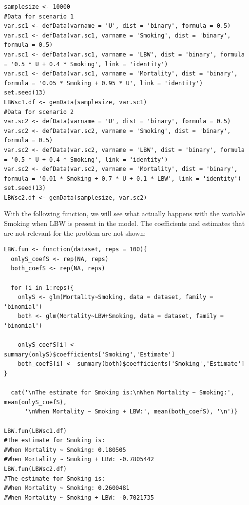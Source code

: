\documentclass{article}
\begin{document}
\begin{lstlisting}
samplesize <- 10000
#Data for scenario 1
var.sc1 <- defData(varname = 'U', dist = 'binary', formula = 0.5)
var.sc1 <- defData(var.sc1, varname = 'Smoking', dist = 'binary', formula = 0.5)
var.sc1 <- defData(var.sc1, varname = 'LBW', dist = 'binary', formula = '0.5 * U + 0.4 * Smoking', link = 'identity')
var.sc1 <- defData(var.sc1, varname = 'Mortality', dist = 'binary', formula = '0.05 * Smoking + 0.95 * U', link = 'identity')
set.seed(13)
LBWsc1.df <- genData(samplesize, var.sc1)
#Data for scenario 2
var.sc2 <- defData(varname = 'U', dist = 'binary', formula = 0.5)
var.sc2 <- defData(var.sc2, varname = 'Smoking', dist = 'binary', formula = 0.5)
var.sc2 <- defData(var.sc2, varname = 'LBW', dist = 'binary', formula = '0.5 * U + 0.4 * Smoking', link = 'identity')
var.sc2 <- defData(var.sc2, varname = 'Mortality', dist = 'binary', formula = '0.01 * Smoking + 0.7 * U + 0.1 * LBW', link = 'identity')
set.seed(13)
LBWsc2.df <- genData(samplesize, var.sc2)
\end{lstlisting}

With the following function, we will see what actually happens with the variable Smoking when LBW is present in the model. The coefficients and estimates that are not relevant for the problem are not shown:\par

\begin{lstlisting}
LBW.fun <- function(dataset, reps = 100){
  onlyS_coefS <- rep(NA, reps)
  both_coefS <- rep(NA, reps)
  
  for (i in 1:reps){
    onlyS <- glm(Mortality~Smoking, data = dataset, family = 'binomial')
    both <- glm(Mortality~LBW+Smoking, data = dataset, family = 'binomial')
    
    onlyS_coefS[i] <- summary(onlyS)$coefficients['Smoking','Estimate']
    both_coefS[i] <- summary(both)$coefficients['Smoking','Estimate'] }
  
  cat('\nThe estimate for Smoking is:\nWhen Mortality ~ Smoking:', mean(onlyS_coefS),
      '\nWhen Mortality ~ Smoking + LBW:', mean(both_coefS), '\n')}
      
LBW.fun(LBWsc1.df)
#The estimate for Smoking is:
#When Mortality ~ Smoking: 0.180505 
#When Mortality ~ Smoking + LBW: -0.7805442
LBW.fun(LBWsc2.df)
#The estimate for Smoking is:
#When Mortality ~ Smoking: 0.2600481 
#When Mortality ~ Smoking + LBW: -0.7021735 
\end{lstlisting}
\end{document}
